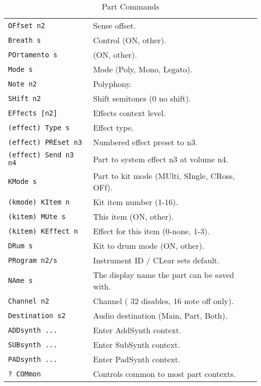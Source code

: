    \begin{table}[H]
      \centering
      \caption{Part Commands}
      \label{table:yoshimi_part_commands}
      \begin{tabular}{l l}

\texttt{OFfset n2} &
   Sense offset.  \\
\texttt{Breath s} &
   Control (ON, {other}).  \\
\texttt{POrtamento s} &
   (ON, other).   \\
\texttt{Mode s} &
   Mode (Poly, Mono, Legato). \\
\texttt{Note n2} &
   Polyphony.  \\
\texttt{SHift n2} &
   Shift semitones (0 no shift). \\
\texttt{EFfects [n2]} &
   Effects context level.  \\
 \texttt{(effect) Type s} &
   Effect type.   \\
 \texttt{(effect) PREset n3} &
   Numbered effect preset to n3. \\
 \texttt{(effect) Send n3 n4} &
   Part to system effect n3 at volume n4. \\
\texttt{KMode s} &
   Part to kit mode (MUlti, SIngle, CRoss, OFf).   \\
 \texttt{(kmode) KItem n} &
   Kit item number (1-16). \\
   \texttt{(kitem) MUte s} &
      This item (ON, {other}).   \\
   \texttt{(kitem) KEffect n} &
      Effect for this item (0-none, 1-3). \\
 \texttt{DRum s} &
   Kit to drum mode (ON, {other}).  \\
\texttt{PRogram n2/s} &
   Instrument ID / CLear sets default. \\
\texttt{NAme s} &
   The display name the part can be saved with. \\
\texttt{Channel n2} &
   Channel ( 32 disables,  16 note off only).   \\
\texttt{Destination s2} &
   Audio destination (Main, Part, Both).  \\
\texttt{ADDsynth ...} &
   Enter AddSynth context. \\
\texttt{SUBsynth ...} &
   Enter SubSynth context. \\
\texttt{PADsynth ...} &
   Enter PadSynth context. \\
\texttt{? COMmon} &
   Controls common to most part contexts. \\

      \end{tabular}
   \end{table}

